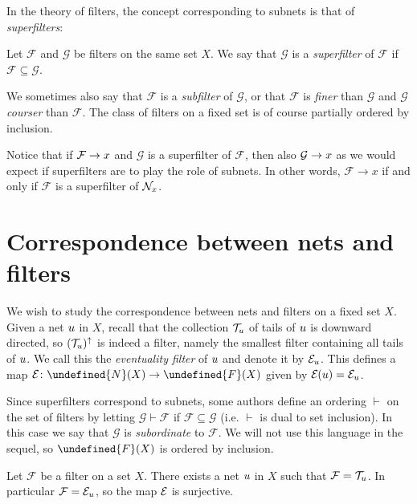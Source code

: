 \documentclass[article, a4paper, 11pt, oneside]{memoir}
\let\mathfrak\undefined
\numberwithin{equation}{chapter}
\newcommand{\calF}{\mathcal{F}}
\newcommand{\calG}{\mathcal{G}}
\theoremstyle{nonumberplain}
\begin{document}
In the theory of filters, the concept corresponding to subnets is that of \emph{superfilters}:

\begin{definition}[Superfilters]
    Let $\calF$ and $\calG$ be filters on the same set $X$. We say that $\calG$ is a \emph{superfilter} of $\calF$ if $\calF \subseteq \calG$.
\end{definition}
%
We sometimes also say that $\calF$ is a \emph{subfilter} of $\calG$, or that $\calF$ is \emph{finer} than $\calG$ and $\calG$ \emph{courser} than $\calF$. The class of filters on a fixed set is of course partially ordered by inclusion.

Notice that if $\calF \to \mylimit$ and $\calG$ is a superfilter of $\calF$, then also $\calG \to \mylimit$ as we would expect if superfilters are to play the role of subnets. In other words, $\calF \to x$ if and only if $\calF$ is a superfilter of $\nhoods{x}$.


\chapter{Correspondence between nets and filters}

\newcommand{\filter}{\mathfrak{F}}

\newcommand{\filters}[1]{\mathfrak{F}(#1)}
\newcommand{\nets}[1]{\mathfrak{N}(#1)}
\newcommand{\netseq}[1]{\tilde{\mathfrak{N}}(#1)}

\newcommand{\subord}{\vdash}

We wish to study the correspondence between nets and filters on a fixed set $X$. Given a net $\mynet$ in $X$, recall that the collection $\tails{\mynet}$ of tails of $\mynet$ is downward directed, so $(\tails{\mynet})^\uparrow$ is indeed a filter, namely the smallest filter containing all tails of $\mynet$. We call this the \emph{eventuality filter} of $\mynet$ and denote it by $\evfilt[\mynet]$. This defines a map $\evfilt \colon \nets{X} \to \filters{X}$ given by $\evfilt(\mynet) = \evfilt[\mynet]$.

Since superfilters correspond to subnets, some authors define an ordering $\subord$ on the set of filters by letting $\calG \subord \calF$ if $\calF \subseteq \calG$ (i.e. $\subord$ is dual to set inclusion). In this case we say that $\calG$ is \emph{subordinate} to $\calF$. We will not use this language in the sequel, so $\filters{X}$ is ordered by inclusion.

\begin{lemma}
    Let $\calF$ be a filter on a set $X$. There exists a net $\mynet$ in $X$ such that $\calF = \tails{\mynet}$. In particular $\calF = \evfilt[\mynet]$, so the map $\evfilt$ is surjective.
\end{lemma}
\end{document}
